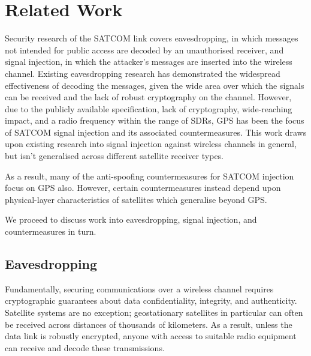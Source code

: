 \section{Related Work}


Security research of the SATCOM link covers eavesdropping, in which messages not intended for public access are decoded by an unauthorised receiver, and signal injection, in which the attacker's messages are inserted into the wireless channel.
Existing eavesdropping research has demonstrated the widespread effectiveness of decoding the messages, given the wide area over which the signals can be received and the lack of robust cryptography on the channel.
However, due to the publicly available specification, lack of cryptography, wide-reaching impact, and a radio frequency within the range of SDRs, GPS has been the focus of SATCOM signal injection and its associated countermeasures.
This work draws upon existing research into signal injection against wireless channels in general, but isn't generalised across different satellite receiver types.

As a result, many of the anti-spoofing countermeasures for SATCOM injection focus on GPS also.
However, certain countermeasures instead depend upon physical-layer characteristics of satellites which generalise beyond GPS.

We proceed to discuss work into eavesdropping, signal injection, and countermeasures in turn.

\subsection{Eavesdropping}



Fundamentally, securing communications over a wireless channel requires cryptographic guarantees about data confidentiality, integrity, and authenticity.
Satellite systems are no exception; geostationary satellites in particular can often be received across distances of thousands of kilometers.
As a result, unless the data link is robustly encrypted, anyone with access to suitable radio equipment can receive and decode these transmissions.

